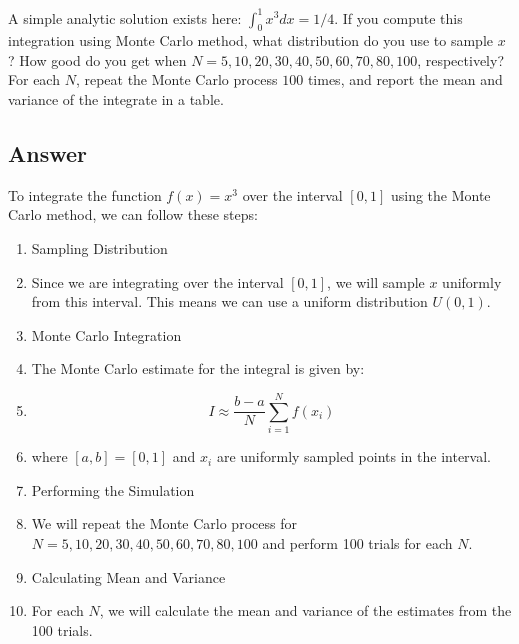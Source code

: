 \documentclass[a4paper, utf8]{ctexart}
\begin{document}
	A simple analytic solution exists here: $\int_{0}^{1}x^3 dx=1/4$. If you compute this integration using Monte Carlo method, what distribution do you use to sample $x$? How good do you get when $N = 5, 10, 20, 30, 40, 50, 60, 70, 80, 100$, respectively? For each $N$, repeat the Monte Carlo process $100$ times, and report the mean and variance of the integrate in a table.
	
	\subsection{Answer}
	
	To integrate the function $ f(x) = x^3 $ over the interval $[0, 1]$ using the Monte Carlo method, we can follow these steps:
	
	\begin{enumerate}[itemsep=2pt, topsep=0pt, parsep=0pt]
		\item Sampling Distribution
	
		\item[] Since we are integrating over the interval $[0, 1]$, we will sample $x$ uniformly from this interval. This means we can use a uniform distribution $ U(0, 1) $.
	
		\item Monte Carlo Integration
	
		\item[] The Monte Carlo estimate for the integral is given by:
	
		\item[] \begin{equation} I \approx \frac{b-a}{N} \sum_{i=1}^{N} f(x_i) \nonumber \end{equation}
		
		\item[]	where $ [a, b] = [0, 1] $ and $ x_i $ are uniformly sampled points in the interval.
	
		\item Performing the Simulation
		
		\item[] We will repeat the Monte Carlo process for $ N = 5, 10, 20, 30, 40, 50, 60, 70, 80, 100 $ and perform 100 trials for each $N$.
	
		\item Calculating Mean and Variance
		
		\item[] For each $N$, we will calculate the mean and variance of the estimates from the 100 trials.
	\end{enumerate}
	
\end{document}
